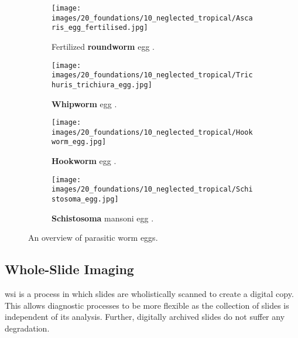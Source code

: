 \begin{figure}[tb]
    \centering
    \begin{subfigure}[t]{0.4\textwidth}
        \centering
        \texttt{[image: images/20\_foundations/10\_neglected\_tropical/Ascaris\_egg\_fertilised.jpg]}
        \caption{Fertilized \textbf{roundworm} egg \cite{dpdx2019ascariasis}.}
        \label{fig:Foundations:NCLs:Diagnosis:Ascaris:Egg}
        \vspace*{2mm}
    \end{subfigure}
    \hspace*{1em}
    \begin{subfigure}[t]{0.4\textwidth}
        \centering
        \texttt{[image: images/20\_foundations/10\_neglected\_tropical/Trichuris\_trichiura\_egg.jpg]}
        \caption{\textbf{Whipworm} egg \cite{dpdx2017trichuriasis}.}
        \label{fig:Foundations:NCLs:Diagnosis:Whipworm:Egg}
        \vspace*{2mm}
    \end{subfigure}

    \begin{subfigure}[t]{0.4\textwidth}
        \centering
        \texttt{[image: images/20\_foundations/10\_neglected\_tropical/Hookworm\_egg.jpg]}
        \caption{\textbf{Hookworm} egg \cite{dpdx2019hookworm}.}
        \label{fig:Foundations:NCLs:Diagnosis:Hookworm:Egg}
    \end{subfigure}
    \hspace*{1em}
    \begin{subfigure}[t]{0.4\textwidth}
        \centering
        \texttt{[image: images/20\_foundations/10\_neglected\_tropical/Schistosoma\_egg.jpg]}
        \caption{\textbf{Schistosoma} mansoni egg \cite{dpdx2019schistosomiasis}.}
        \label{fig:Foundations:NCLs:Diagnosis:Schistosoma:Egg}
    \end{subfigure}
    \caption{An overview of parasitic worm eggs.}
    \label{fig:Foundations:NCLs:Diagnosis:Overview}
\end{figure}

\subsection{Whole-Slide Imaging}
\label{sec:Foundations:NTDs:WHoleSlideImaging}

\Acf{wsi} \cite{ghaznavi2013digital, hanna2019whole, el-gabry2014wholeslide} is a process in which slides are wholistically scanned to create a digital copy. This allows diagnostic processes to be more flexible as the collection of slides is independent of its analysis. Further, digitally archived slides do not suffer any degradation. 

